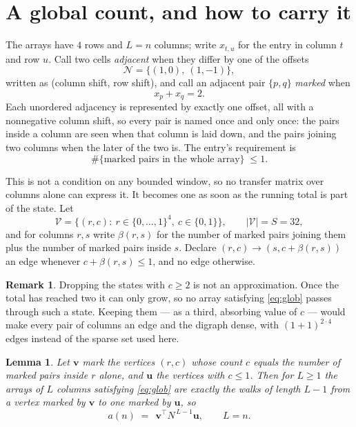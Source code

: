 \documentclass[11pt,a4paper]{article}
\theoremstyle{plain}
\newtheorem{lemma}[theorem]{Lemma}
\theoremstyle{definition}
\newtheorem{remark}[theorem]{Remark}
\begin{document}
\section{A global count, and how to carry it}

The arrays have $4$ rows and $L=n$ columns; write $x_{t,u}$ for the entry in
column $t$ and row $u$. Call two cells \emph{adjacent} when they differ by one of the
offsets
\[
\mathcal N=\{(1,0),\ (1,-1)\},
\]
written as (column shift, row shift), and call an adjacent pair $\{p,q\}$
\emph{marked} when
\[
x_{p}+x_{q}=2 .
\]
Each unordered adjacency is represented by exactly one offset, all with a nonnegative column
shift, so every pair is named once and only once: the pairs inside a column are seen when
that column is laid down, and the pairs joining two columns when the later of the two is. The
entry's requirement is
\begin{equation}\label{eq:glob}
\#\{\text{marked pairs in the whole array}\}\;\le1.
\end{equation}

This is not a condition on any bounded window, so no transfer matrix over columns alone can
express it. It becomes one as soon as the running total is part of the state. Let
\[
\mathcal V=\bigl\{(r,c):\ r\in\{0,\dots,1\}^{4},\ c\in\{0,1\}\bigr\},
\qquad |\mathcal V|=S=32,
\]
and for columns $r,s$ write $\beta(r,s)$ for the number of marked pairs joining them plus the
number of marked pairs inside $s$. Declare $(r,c)\to(s,c+\beta(r,s))$ an edge whenever
$c+\beta(r,s)\le1$, and no edge otherwise.

\begin{remark}
Dropping the states with $c\ge2$ is not an approximation. Once the total has reached two it
can only grow, so no array satisfying \eqref{eq:glob} passes through such a state. Keeping
them --- as a third, absorbing value of $c$ --- would make every pair of columns an edge and
the digraph dense, with $(1+1)^{2\cdot4}$ edges instead of the sparse set used here.
\end{remark}

\begin{lemma}\label{lem:walk}
Let $\mathbf{v}$ mark the vertices $(r,c)$ whose count $c$ equals the number of marked pairs
inside $r$ alone, and $\mathbf{u}$ the vertices with $c\le1$. Then for $L\ge1$ the arrays
of $L$ columns satisfying \eqref{eq:glob} are exactly the walks of length $L-1$ from a
vertex marked by $\mathbf{v}$ to one marked by $\mathbf{u}$, so
\[
a(n)\;=\;\,\mathbf{v}^{\!\top}N^{\,L-1}\mathbf{u},\qquad L=n .
\]
\end{lemma}
\end{document}
